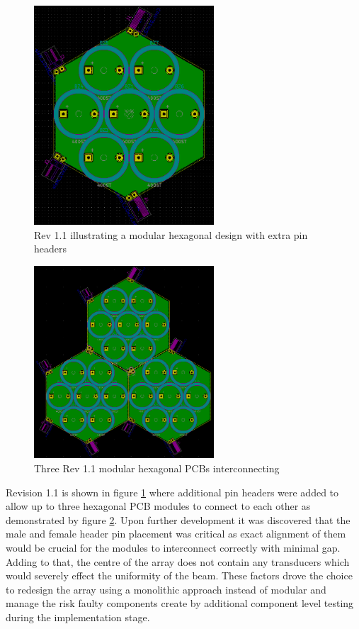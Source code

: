 \begin{figure}[ht!]
    \centering
    \includegraphics[width=0.6\textwidth]{Figures/Design/PCB/closeups/hexrev1.1.png}
    \caption{Rev 1.1 illustrating a modular hexagonal design with extra pin headers}
    \label{fig:modHex1.1}
\end{figure}

\begin{figure}[ht!]
    \centering
    \includegraphics[width=0.6\textwidth]{Figures/Design/PCB/closeups/3xhex1.1.png}
    \caption{Three Rev 1.1 modular hexagonal PCBs interconnecting}
    \label{fig:3modHex1.1}
\end{figure}


Revision 1.1 is shown in figure \ref{fig:modHex1.1} where additional pin headers were added to allow up to three hexagonal PCB modules to connect to each other as demonstrated by figure \ref{fig:3modHex1.1}. Upon further development it was discovered that the male and female header pin placement was critical as exact alignment of them would be crucial for the modules to interconnect correctly with minimal gap. Adding to that, the centre of the array does not contain any transducers which would severely effect the uniformity of the beam. These factors drove the choice to redesign the array using a monolithic approach instead of modular and manage the risk faulty components create by additional component level testing during the implementation stage.


